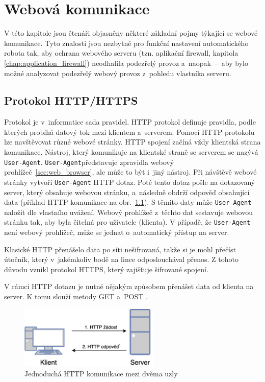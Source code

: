 \chapter{Webová komunikace}
\label{chap:web_communication}
V této kapitole jsou čtenáři objasněny některé základní pojmy týkající se webové komunikace. Tyto znalosti jsou nezbytné pro funkční nastavení automatického robota tak, aby ochrana webového serveru (tzn. aplikační firewall, kapitola \ref{chap:application_firewall}) neodhalila podezřelý provoz a~naopak~--~aby bylo možné analyzovat podezřelý webový provoz z~pohledu vlastníka serveru.

\section{Protokol HTTP/HTTPS}
\label{sec:http}
Protokol je v~informatice sada pravidel. HTTP protokol definuje pravidla, podle kterých probíhá datový tok mezi klientem a~serverem. Pomocí HTTP protokolu lze navštěvovat různé webové stránky. HTTP spojení začíná vždy klientská strana komunikace. Nástroj, který komunikuje na klientské straně se serverem se nazývá \texttt{User-Agent}. \texttt{User-Agent}představuje zpravidla webový prohlížeč~\ref{sec:web_browser}, ale může to být i~jiný nástroj.
Při návštěvě webové stránky vytvoří \texttt{User-Agent} HTTP dotaz. Poté tento dotaz pošle na dotazovaný server, který obsahuje webovou stránku, a~následně obdrží odpověď obsahující data (příklad HTTP komunikace na obr.~\ref{img:HTTP_request}). S těmito daty může \texttt{User-Agent} naložit dle vlastního uvážení. Webový prohlížeč z~těchto dat sestavuje webovou stránku tak, aby byla čitelná pro uživatele (klienta). V případě, že \texttt{User-Agent} není webový prohlížeč, může se jednat o~automatický přístup na server.

Klasické HTTP přenášelo data po síti nešifrovaná, takže si je mohl přečíst útočník, který v~jakémkoliv bodě na lince odposlouchával přenos. Z tohoto důvodu vznikl protokol HTTPS, který zajišťuje šifrované spojení.

V rámci HTTP dotazu je nutné nějakým způsobem přenášet data od klienta na server. K tomu slouží metody GET a~POST \cite{bib:httpRFC}. 

\begin{figure}[hbt]
	\centering
	\includegraphics[width=0.6\textwidth]{images/HTTP_request.png}
	\caption{Jednoduchá HTTP komunikace mezi dvěma uzly}
	\label{img:HTTP_request}
\end{figure}

